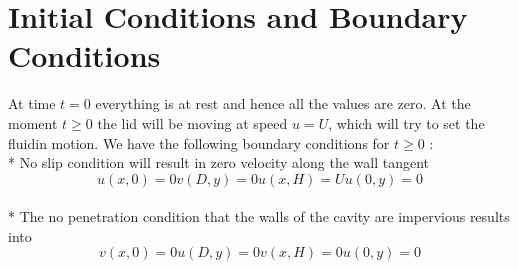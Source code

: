 \documentclass{article}
\begin{document}
\section{Initial Conditions and Boundary Conditions}

At time $t=0$ everything is at rest and hence all the values are zero. At the moment $t \geq0$ the lid will be moving at speed $u=U$, which will try to set the fluidin motion. We have the following boundary conditions for $t\geq0$ :
\\*
No slip condition will result in zero velocity along the wall tangent
\begin{subequations}
\begin{equation}
u(x,0)=0
\end{equation}
\begin{equation}
v(D,y)=0
\end{equation}
\begin{equation}
u(x,H)=U
\end{equation}
\begin{equation}
u(0,y)=0
\end{equation}
\end{subequations}
\\*
The no penetration condition that the walls of the cavity are impervious results into
\begin{subequations}
\begin{equation}
v(x,0)=0
\end{equation}
\begin{equation}
u(D,y)=0
\end{equation}
\begin{equation}
v(x,H)=0
\end{equation}
\begin{equation}
u(0,y)=0
\end{equation}
\end{subequations}
\end{document}
